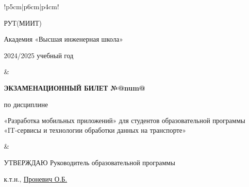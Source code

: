 
\begin{tabular}{!{\vrule width 2pt}p{5cm}|p{6cm}|p{4cm}!{\vrule width 2pt}}

    {\centering 
    \fontsize{14pt}{16pt}\selectfont
    РУТ(МИИТ)

\vspace{14pt}

Академия «Высшая инженерная школа»

\vspace{14pt}

2024/2025 учебный год

    }
&
{
    \centering
\fontsize{14pt}{16pt}\selectfont

\textbf{ЭКЗАМЕНАЦИОННЫЙ
БИЛЕТ №@num@}


по дисциплине 

«Разработка мобильных приложений» 
\fontsize{12pt}{14pt}\selectfont
для студентов образовательной программы «IT-сервисы и технологии обработки данных на транспорте»

}
&
{
\centering
\fontsize{14pt}{16pt}\selectfont

УТВЕРЖДАЮ
Руководитель образовательной программы

\vspace{1cm}

\fontsize{12pt}{14pt}\selectfont
\underline{\hspace{3cm}}

к.т.н., \underline{Проневич О.Б.}

}
\\
\hline
{}
\\
\end{tabular}

\newpage